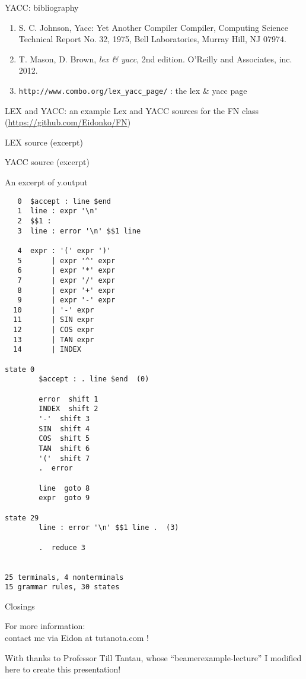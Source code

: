 \begin{frame}[fragile]{YACC: bibliography}

\begin{enumerate}
\item \label{yacc} S. C. Johnson, Yacc: Yet Another Compiler Compiler, Computing Science Technical Report No. 32, 1975, Bell Laboratories, Murray Hill, NJ
07974.
\item T. Mason, D. Brown, {\em lex \& yacc\/}, 2nd edition. O'Reilly and Associates, inc. 2012.
\item \verb"http://www.combo.org/lex_yacc_page/" : the lex \& yacc page
\end{enumerate}

\end{frame}
\begin{frame}[fragile]{LEX and YACC: an example}
Lex and YACC sources for the FN class
(\url{https://github.com/Eidonko/FN})


\vspace{20pt}

\begin{center}LEX source (excerpt) \end{center}


\vspace{20pt}

\begin{center}YACC source (excerpt) \end{center}

\end{frame}
\begin{frame}[fragile]{An excerpt of y.output}
\begin{verbatim}
   0  $accept : line $end
   1  line : expr '\n'
   2  $$1 :
   3  line : error '\n' $$1 line

   4  expr : '(' expr ')'
   5       | expr '^' expr
   6       | expr '*' expr
   7       | expr '/' expr
   8       | expr '+' expr
   9       | expr '-' expr
  10       | '-' expr
  11       | SIN expr
  12       | COS expr
  13       | TAN expr
  14       | INDEX

state 0
        $accept : . line $end  (0)

        error  shift 1
        INDEX  shift 2
        '-'  shift 3
        SIN  shift 4
        COS  shift 5
        TAN  shift 6
        '('  shift 7
        .  error

        line  goto 8
        expr  goto 9

state 29
        line : error '\n' $$1 line .  (3)

        .  reduce 3


25 terminals, 4 nonterminals
15 grammar rules, 30 states
\end{verbatim}

\end{frame}

\begin{frame}[fragile]{Closings}
\begin{center}
\Large For more information:\\
contact me via Eidon at tutanota.com !
\end{center}

\vspace{20pt}

With thanks to Professor Till Tantau, whose
``beamerexample-lecture'' I modified here to create this presentation!

\end{frame}
